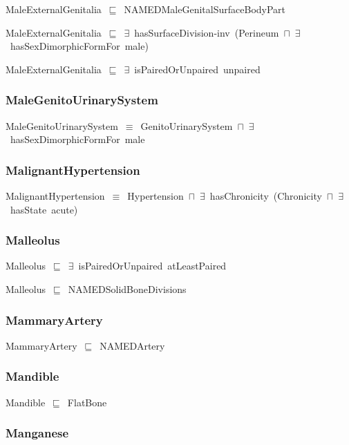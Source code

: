 \documentclass{article}
\begin{document}
MaleExternalGenitalia~\ensuremath{\sqsubseteq}~NAMEDMaleGenitalSurfaceBodyPart~

MaleExternalGenitalia~\ensuremath{\sqsubseteq}~\ensuremath{\exists}~hasSurfaceDivision-inv~(Perineum~\ensuremath{\sqcap}~\ensuremath{\exists}~hasSexDimorphicFormFor~male)~

MaleExternalGenitalia~\ensuremath{\sqsubseteq}~\ensuremath{\exists}~isPairedOrUnpaired~unpaired~

\subsubsection*{MaleGenitoUrinarySystem}

MaleGenitoUrinarySystem~\ensuremath{\equiv}~GenitoUrinarySystem~\ensuremath{\sqcap}~\ensuremath{\exists}~hasSexDimorphicFormFor~male

\subsubsection*{MalignantHypertension}

MalignantHypertension~\ensuremath{\equiv}~Hypertension~\ensuremath{\sqcap}~\ensuremath{\exists}~hasChronicity~(Chronicity~\ensuremath{\sqcap}~\ensuremath{\exists}~hasState~acute)

\subsubsection*{Malleolus}

Malleolus~\ensuremath{\sqsubseteq}~\ensuremath{\exists}~isPairedOrUnpaired~atLeastPaired~

Malleolus~\ensuremath{\sqsubseteq}~NAMEDSolidBoneDivisions~

\subsubsection*{MammaryArtery}

MammaryArtery~\ensuremath{\sqsubseteq}~NAMEDArtery~

\subsubsection*{Mandible}

Mandible~\ensuremath{\sqsubseteq}~FlatBone~

\subsubsection*{Manganese}
\end{document}
